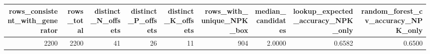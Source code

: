 \begin{tabular}{rrrrrrrrr}
\toprule
rows_consistent_with_generator & rows_total & distinct_N_offsets & distinct_P_offsets & distinct_K_offsets & rows_with_unique_NPK_box & median_candidates & lookup_expected_accuracy_NPK_only & random_forest_cv_accuracy_NPK_only \\
\midrule
2200 & 2200 & 41 & 26 & 11 & 904 & 2.0000 & 0.6582 & 0.6500 \\
\bottomrule
\end{tabular}
